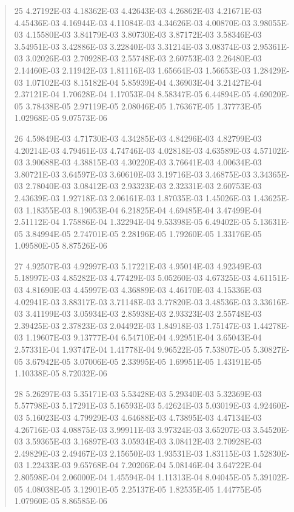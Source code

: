 \documentclass[letterpaper,10pt,english]{sphinxmanual}
\begin{document}
\begin{quote}
\begin{DUlineblock}{0em}
\item[] 25   4.27192E-03  4.18362E-03  4.42643E-03  4.26862E-03  4.21671E-03  4.45436E-03  4.16944E-03  4.11084E-03  4.34626E-03  4.00870E-03  3.98055E-03  4.15580E-03  3.84179E-03  3.80730E-03  3.87172E-03  3.58346E-03  3.54951E-03  3.42886E-03  3.22840E-03  3.31214E-03  3.08374E-03  2.95361E-03  3.02026E-03  2.70928E-03  2.55748E-03  2.60753E-03  2.26480E-03  2.14460E-03  2.11942E-03  1.81116E-03  1.65664E-03  1.56653E-03  1.28429E-03  1.07102E-03  8.15182E-04  5.85939E-04  4.36903E-04  3.21427E-04  2.37121E-04  1.70628E-04  1.17053E-04  8.58347E-05  6.44894E-05  4.69020E-05  3.78438E-05  2.97119E-05  2.08046E-05  1.76367E-05  1.37773E-05  1.02968E-05  9.07573E-06
\item[] 26   4.59849E-03  4.71730E-03  4.34285E-03  4.84296E-03  4.82799E-03  4.20214E-03  4.79461E-03  4.74746E-03  4.02818E-03  4.63589E-03  4.57102E-03  3.90688E-03  4.38815E-03  4.30220E-03  3.76641E-03  4.00634E-03  3.80721E-03  3.64597E-03  3.60610E-03  3.19716E-03  3.46875E-03  3.34365E-03  2.78040E-03  3.08412E-03  2.93323E-03  2.32331E-03  2.60753E-03  2.43639E-03  1.92718E-03  2.06161E-03  1.87035E-03  1.45026E-03  1.43625E-03  1.18355E-03  8.19053E-04  6.21825E-04  4.69485E-04  3.47499E-04  2.51112E-04  1.75886E-04  1.32294E-04  9.53398E-05  6.49402E-05  5.13631E-05  3.84994E-05  2.74701E-05  2.28196E-05  1.79260E-05  1.33176E-05  1.09580E-05  8.87526E-06
\item[] 27   4.92507E-03  4.92997E-03  5.17221E-03  4.95014E-03  4.92349E-03  5.18997E-03  4.85282E-03  4.77429E-03  5.05260E-03  4.67325E-03  4.61151E-03  4.81690E-03  4.45997E-03  4.36889E-03  4.46170E-03  4.15336E-03  4.02941E-03  3.88317E-03  3.71148E-03  3.77820E-03  3.48536E-03  3.33616E-03  3.41199E-03  3.05934E-03  2.85938E-03  2.93323E-03  2.55748E-03  2.39425E-03  2.37823E-03  2.04492E-03  1.84918E-03  1.75147E-03  1.44278E-03  1.19607E-03  9.13777E-04  6.54710E-04  4.92951E-04  3.65043E-04  2.57331E-04  1.93747E-04  1.41778E-04  9.96522E-05  7.53807E-05  5.30827E-05  3.67942E-05  3.07006E-05  2.33995E-05  1.69951E-05  1.43191E-05  1.10338E-05  8.72032E-06
\item[] 28   5.26297E-03  5.35171E-03  5.53428E-03  5.29340E-03  5.32369E-03  5.57798E-03  5.17291E-03  5.16593E-03  5.42624E-03  5.03019E-03  4.92460E-03  5.16023E-03  4.79929E-03  4.64688E-03  4.73895E-03  4.47134E-03  4.26716E-03  4.08875E-03  3.99911E-03  3.97324E-03  3.65207E-03  3.54520E-03  3.59365E-03  3.16897E-03  3.05934E-03  3.08412E-03  2.70928E-03  2.49829E-03  2.49467E-03  2.15650E-03  1.93531E-03  1.83115E-03  1.52830E-03  1.22433E-03  9.65768E-04  7.20206E-04  5.08146E-04  3.64722E-04  2.80598E-04  2.06000E-04  1.45594E-04  1.11313E-04  8.04045E-05  5.39102E-05  4.08038E-05  3.12901E-05  2.25137E-05  1.82535E-05  1.44775E-05  1.07960E-05  8.86585E-06

\end{DUlineblock}
\end{quote}
\end{document}
